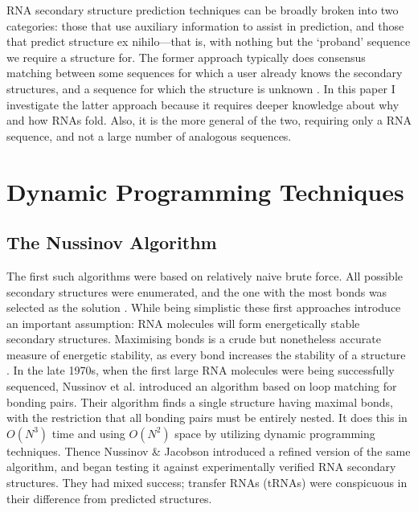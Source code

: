 \documentclass{cshonours}
\begin{document}
RNA secondary structure prediction techniques can be broadly broken into two categories: those that use auxiliary information to assist in prediction, and those that predict structure ex nihilo---that is, with nothing but the `proband' sequence we require a structure for. The former approach typically does consensus matching between some sequences for which a user already knows the secondary structures, and a sequence for which the structure is unknown \cite{hofacker2008rna}. In this paper I investigate the latter approach because it requires deeper knowledge about why and how RNAs fold. Also, it is the more general of the two, requiring only a RNA sequence, and not a large number of analogous sequences.



\section{Dynamic Programming Techniques}
\subsection{The Nussinov Algorithm}
The first such algorithms were based on relatively naive brute force. All possible secondary structures were enumerated, and the one with
the most bonds was selected as the solution \cite{nussinov1978algorithms}. While being simplistic
these first approaches introduce an important assumption: RNA molecules will
form energetically stable secondary structures. Maximising bonds is a crude but
nonetheless accurate measure of energetic stability, as every bond increases the
stability of a structure \cite{nussinov1978algorithms}. In the late 1970s, when the first large RNA molecules
were being successfully sequenced, Nussinov et al. \cite{nussinov1978algorithms} introduced an algorithm
based on loop matching for bonding pairs. Their algorithm finds a
single structure having maximal bonds, with the restriction that all bonding pairs must be entirely nested. It does this in $O(N^3)$ time and using $O(N^2)$ space by utilizing dynamic programming techniques. Thence Nussinov \& Jacobson \cite{nussinov1980fast} introduced
a refined version of the same algorithm, and began testing it against experimentally verified RNA secondary structures. They had mixed success; transfer RNAs
(tRNAs) were conspicuous in their difference from predicted structures.
\end{document}
